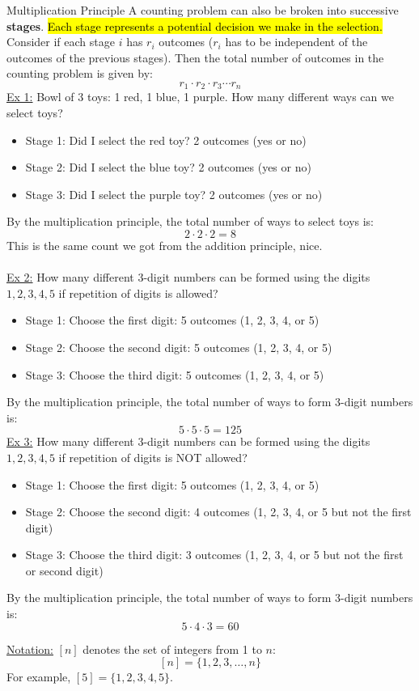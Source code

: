 ﻿\documentclass[12pt]{article}
\begin{document}
\begin{theorem}{Multiplication Principle}
    A counting problem can also be broken into successive \textbf{stages}. \hl{Each stage represents a potential decision we make in the selection.} Consider if each stage $i$ has $r_i$ outcomes ($r_i$ has to be independent of the outcomes of the previous stages). Then the total number of outcomes in the counting problem is given by:
    \[r_1 \cdot r_2 \cdot r_3 \cdots r_n\]
    \underline{Ex 1:} Bowl of 3 toys: 1 red, 1 blue, 1 purple. How many different ways can we select toys?
    \begin{itemize}
        \item Stage 1: Did I select the red toy? 2 outcomes (yes or no)
        \item Stage 2: Did I select the blue toy? 2 outcomes (yes or no)
        \item Stage 3: Did I select the purple toy? 2 outcomes (yes or no)
    \end{itemize}
    By the multiplication principle, the total number of ways to select toys is:
    \[2 \cdot 2 \cdot 2 = 8\]
    This is the same count we got from the addition principle, nice.\\\\
    \underline{Ex 2:} How many different 3-digit numbers can be formed using the digits ${1, 2, 3, 4, 5}$ if repetition of digits is allowed?
    \begin{itemize}
        \item Stage 1: Choose the first digit: 5 outcomes (1, 2, 3, 4, or 5)
        \item Stage 2: Choose the second digit: 5 outcomes (1, 2, 3, 4, or 5)
        \item Stage 3: Choose the third digit: 5 outcomes (1, 2, 3, 4, or 5)
    \end{itemize}
    By the multiplication principle, the total number of ways to form 3-digit numbers is:
    \[5 \cdot 5 \cdot 5 = 125\]
    \underline{Ex 3:} How many different 3-digit numbers can be formed using the digits ${1, 2, 3, 4, 5}$ if repetition of digits is NOT allowed?
    \begin{itemize}
        \item Stage 1: Choose the first digit: 5 outcomes (1, 2, 3, 4, or 5)
        \item Stage 2: Choose the second digit: 4 outcomes (1, 2, 3, 4, or 5 but not the first digit)
        \item Stage 3: Choose the third digit: 3 outcomes (1, 2, 3, 4, or 5 but not the first or second digit)
    \end{itemize}
    By the multiplication principle, the total number of ways to form 3-digit numbers is:
    \[5 \cdot 4 \cdot 3 = 60\]
\end{theorem}
\underline{Notation:} $[n]$ denotes the set of integers from 1 to $n$:
\[[n] = \{1, 2, 3, \ldots, n\}\]
For example, $[5] = \{1, 2, 3, 4, 5\}$.
\end{document}
